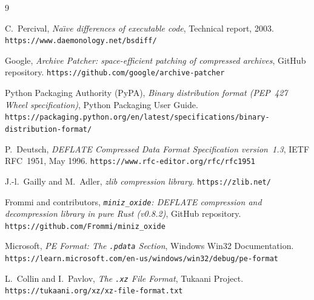 \documentclass[10pt,letterpaper]{article}
\theoremstyle{remark}
\begin{document}
\begin{thebibliography}{9}
\raggedright

C.~Percival,
\emph{Na\"{\i}ve differences of executable code},
Technical report, 2003.
\nolinkurl{https://www.daemonology.net/bsdiff/}

Google,
\emph{Archive Patcher: space-efficient patching of compressed archives},
GitHub repository.
\nolinkurl{https://github.com/google/archive-patcher}

Python Packaging Authority (PyPA),
\emph{Binary distribution format (PEP~427 Wheel specification)},
Python Packaging User Guide.
\nolinkurl{https://packaging.python.org/en/latest/specifications/binary-distribution-format/}

P.~Deutsch,
\emph{DEFLATE Compressed Data Format Specification version~1.3},
IETF RFC~1951, May 1996.
\nolinkurl{https://www.rfc-editor.org/rfc/rfc1951}

J.-l.~Gailly and M.~Adler,
\emph{zlib compression library}.
\nolinkurl{https://zlib.net/}

Frommi and contributors,
\emph{\texttt{miniz\_oxide}: DEFLATE compression and decompression library in pure Rust (v0.8.2)},
GitHub repository.
\nolinkurl{https://github.com/Frommi/miniz_oxide}

Microsoft,
\emph{PE Format: The \texttt{.pdata} Section},
Windows Win32 Documentation.
\nolinkurl{https://learn.microsoft.com/en-us/windows/win32/debug/pe-format}

L.~Collin and I.~Pavlov,
\emph{The \texttt{.xz} File Format},
Tukaani Project.
\nolinkurl{https://tukaani.org/xz/xz-file-format.txt}

\end{thebibliography}
\end{document}

